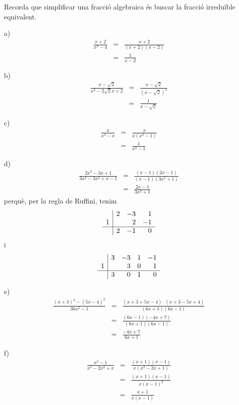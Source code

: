 \begin{solucio}
Recorda que simplificar una fracció algebraica és buscar la fracció irreduïble equivalent.

a)\begin{eqnarray*}
\frac{x+2}{x^{2}-4} &=&\frac{x+2}{(x+2)(x-2)} \\
&=&\frac{1}{x-2}
\end{eqnarray*}

b)\begin{eqnarray*}
\frac{x-\sqrt{2}}{x^{2}-2\sqrt{2}x+2} &=&\frac{x-\sqrt{2}}{\left( x-\sqrt{2}\right) ^{2}} \\
&=&\frac{1}{x-\sqrt{2}}
\end{eqnarray*}

c)\begin{eqnarray*}
\frac{x}{x^{4}-x} &=&\frac{x}{x(x^{3}-1)} \\
&=&\frac{1}{x^{3}-1}
\end{eqnarray*}

d)\begin{eqnarray*}
\frac{2x^{2}-3x+1}{3x^{3}-3x^{2}+x-1} &=&\frac{(x-1)(2x-1)}{(x-1)(3x^{2}+1)}
\\
&=&\frac{2x-1}{3x^{2}+1}
\end{eqnarray*}perquè, per la regla de Ruffini, tenim\[
\begin{array}{r|rrr}
& 2 & -3 & 1 \\
1 & & 2 & -1 \\\hline
& 2 & -1 & 0\end{array}\]i\[
\begin{array}{r|rrrr}
& 3 & -3 & 1 & -1 \\
1 & & 3 & 0 & 1 \\\hline
& 3 & 0 & 1 & 0\end{array}\]

e)\begin{eqnarray*}
\frac{(x+3)^{2}-(5x-4)^{2}}{36x^{2}-1} &=&\frac{\left( x+3+5x-4\right) \cdot
\left( x+3-5x+4\right) }{(6x+1)(6x-1)} \\
&=&\frac{(6x-1)(-4x+7)}{(6x+1)(6x-1)} \\
&=&\frac{-4x+7}{6x+1}
\end{eqnarray*}

f)\begin{eqnarray*}
\frac{x^{2}-1}{x^{3}-2x^{2}+x} &=&\frac{(x+1)(x-1)}{x(x^{2}-2x+1)} \\
&=&\frac{(x+1)(x-1)}{x(x-1)^{2}} \\
&=&\frac{x+1}{x(x-1)}
\end{eqnarray*}
\end{solucio}

